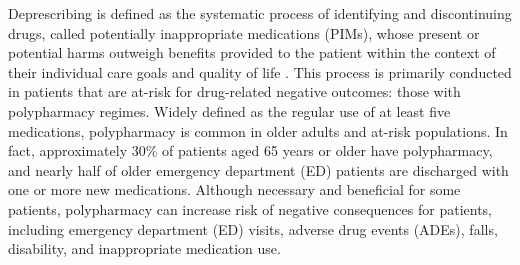 Deprescribing is defined as the systematic process of identifying and discontinuing drugs, called potentially inappropriate medications (PIMs), whose present or potential harms outweigh benefits provided to the patient within the context of their individual care goals and quality of life \citep{hohlPolypharmacyAdverseDrugrelated2001a, scottReducingInappropriatePolypharmacy2015}. This process is primarily conducted in patients that are at-risk for drug-related negative outcomes: those with polypharmacy regimes. Widely defined as the regular use of at least five medications, polypharmacy is common in older adults and at-risk populations\citep{halli-tierneyPolypharmacyEvaluatingRisks2019}. In fact, approximately 30\% of patients aged 65 years or older have polypharmacy\citep{scottReducingInappropriatePolypharmacy2015}, and nearly half of older emergency department (ED) patients are discharged with one or more new medications\cite{skainsGeriatricEmergencyMedication2024}. Although necessary and beneficial for some patients, polypharmacy can increase risk of negative consequences for patients, including emergency department (ED) visits, adverse drug events (ADEs), falls, disability, and inappropriate medication use\cite{halli-tierneyPolypharmacyEvaluatingRisks2019}.

